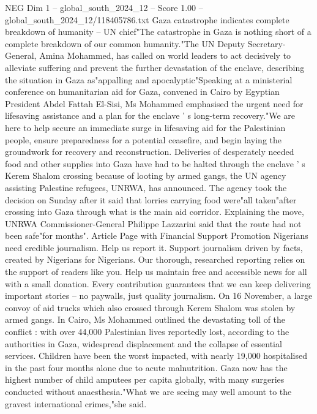 \begin{textsample}{NEG Dim 1 – global\_south\_2024\_12 – Score 1.00 – global\_south\_2024\_12/118405786.txt}  \label{ex:f1_neg_261}
Gaza catastrophe indicates complete breakdown of humanity -- UN chief"The catastrophe in Gaza is nothing short of a complete breakdown of our common humanity."The UN Deputy Secretary-General, Amina Mohammed, has called on world leaders to act decisively to alleviate suffering and prevent the further devastation of the enclave, describing the situation in Gaza as"appalling and apocalyptic"Speaking at a ministerial conference on humanitarian aid for Gaza, convened in Cairo by Egyptian President Abdel Fattah El-Sisi, Ms Mohammed emphasised the urgent need for lifesaving assistance and a plan for the enclave ' s long-term recovery."We are here to help secure an immediate surge in lifesaving aid for the Palestinian people, ensure preparedness for a potential ceasefire, and begin laying the groundwork for recovery and reconstruction.
Deliveries of desperately needed food and other supplies into Gaza have had to be halted through the enclave ' s Kerem Shalom crossing because of looting by armed gangs, the UN agency assisting Palestine refugees, UNRWA, has announced.
The agency took the decision on Sunday after it said that lorries carrying food were"all taken"after crossing into Gaza through what is the main aid corridor.
Explaining the move, UNRWA Commissioner-General Philippe Lazzarini said that the route had not been safe"for months".
Article Page with Financial Support Promotion Nigerians need credible journalism.
Help us report it.
Support journalism driven by facts, created by Nigerians for Nigerians.
Our thorough, researched reporting relies on the support of readers like you.
Help us maintain free and accessible news for all with a small donation.
Every contribution guarantees that we can keep delivering important stories -- no paywalls, just quality journalism.
On 16 November, a large convoy of aid trucks which also crossed through Kerem Shalom was stolen by armed gangs.
In Cairo, Ms Mohammed outlined the devastating toll of the conflict : with over 44,000 Palestinian lives reportedly lost, according to the authorities in Gaza, widespread displacement and the collapse of essential services.
Children have been the worst impacted, with nearly 19,000 hospitalised in the past four months alone due to acute malnutrition.
Gaza now has the highest number of child amputees per capita globally, with many surgeries conducted without anaesthesia."What we are seeing may well amount to the gravest international crimes,"she said.

\end{textsample}
